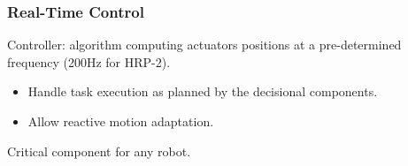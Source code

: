 \documentclass[14pt,utf8,hyperref={pdfpagelabels=false}]{beamer}
\begin{document}
\begin{slideAction}
  \frametitle{Real-Time Control}


  \begin{changeleftmargin}{1.1cm}
  \begin{center}
    Controller: algorithm computing actuators positions at a
    pre-determined frequency (200Hz for HRP-2).

    \bigskip

    \begin{itemize}
    \item Handle task execution as planned by the decisional components.
    \item Allow reactive motion adaptation.
    \end{itemize}

    \bigskip

    \alert{Critical} component for any robot.
  \end{center}
  \end{changeleftmargin}
\end{slideAction}
\end{document}
